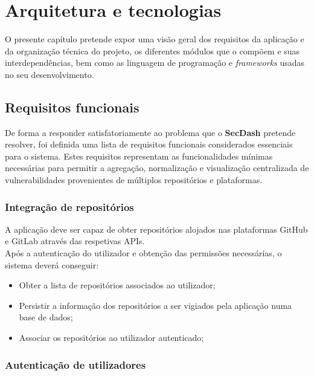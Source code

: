%
%
\chapter{Arquitetura e tecnologias} \label{cap:arquitetura}

O presente capítulo pretende expor uma visão geral dos requisitos da aplicação e da organização técnica do projeto, os diferentes módulos que o compõem e suas interdependências, bem como as linguagem de programação e \textit{frameworks} usadas no seu desenvolvimento.\\

\section{Requisitos funcionais} \label{intro:requisitos}

De forma a responder satisfatoriamente ao problema que o \textbf{SecDash} pretende resolver, foi definida uma lista de requisitos funcionais considerados essenciais para o sistema. Estes requisitos representam as funcionalidades mínimas necessárias para permitir a agregação, normalização e visualização centralizada de vulnerabilidades provenientes de múltiplos repositórios e plataformas. \\

\subsection{Integração de repositórios}

A aplicação deve ser capaz de obter repositórios alojados nas plataformas GitHub e GitLab através das respetivas APIs. \\

Após a autenticação do utilizador e obtenção das permissões necessárias, o sistema deverá conseguir:
\begin{itemize}
	\item Obter a lista de repositórios associados ao utilizador;
	\item Persistir a informação dos repositórios a ser vigiados pela aplicação numa base de dados;
	\item Associar os repositórios ao utilizador autenticado;
\end{itemize}


\subsection{Autenticação de utilizadores}

